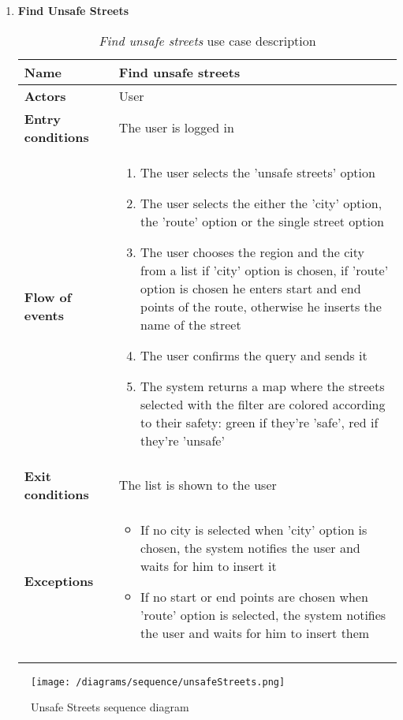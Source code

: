 \begin{enumerate}
				\FloatBarrier
			\item \textbf{Find Unsafe Streets}
				\begin{longtable}{p{0.25\linewidth}p{0.75\linewidth}}
					\toprule
					\textbf{Name} & \textbf{Find unsafe streets} \\
					\midrule
					\textbf{Actors} & User \\
					\midrule
					\textbf{Entry conditions} & The user is logged in \\
					\midrule
					\textbf{Flow of events} & 
					\begin{enumerate}
						\item The user selects the 'unsafe streets' option
						\item The user selects the either the 'city' option, the 'route' option or the single street option
						\item The user chooses the region and the city from a list if 'city' option is chosen, if 'route' option is chosen he enters start and end points of the route, otherwise he inserts the name of the street
						\item The user confirms the query and sends it
						\item The system returns a map where the streets selected with the filter are colored according to their safety: green if they're 'safe', red if they're 'unsafe'
					\end{enumerate} \\
					\midrule
					\textbf{Exit conditions} & The list is shown to the user\\
					\midrule
					\textbf{Exceptions} & 
					\begin{itemize}
						\item If no city is selected when 'city' option is chosen, the system notifies the user and waits for him to insert it
						\item If no start or end points are chosen when 'route' option is selected, the system notifies the user and waits for him to insert them
					\end{itemize} \\
					\bottomrule
					\caption{\emph{Find unsafe streets} use case description}
				\end{longtable}
		\end{enumerate}
		
		\begin{figure}[h]
			\centering
			\texttt{[image: /diagrams/sequence/unsafeStreets.png]}
			\caption{Unsafe Streets sequence diagram}
		\end{figure}
			
